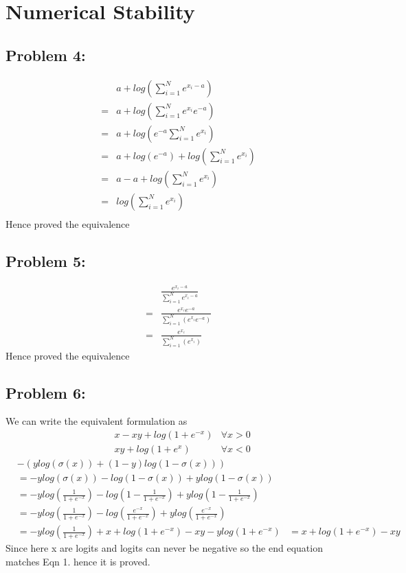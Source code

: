 \documentclass[5pt,a4paper]{article}
\begin{document}
	\section{ Numerical Stability}
	\subsection*{Problem 4:}
	\begin{eqnarray*}
	&a+log(\sum_{i=1}^{N}e^{x_i-a})\\
	=&a+log(\sum_{i=1}^{N}e^{x_i}e^{-a})\\
	=&a+log(e^{-a}\sum_{i=1}^{N}e^{x_i})\\
	=&a+log(e^{-a})+log(\sum_{i=1}^{N}e^{x_i})\\
	=&a-a+log(\sum_{i=1}^{N}e^{x_i})\\
	=&log(\sum_{i=1}^{N}e^{x_i})\\
	\end{eqnarray*}
	Hence proved the equivalence
	
	\subsection*{Problem 5:}
	\begin{eqnarray*}
		&\frac{e^{x_i-a}}{\sum_{i=1}^{N}e^{x_i-a}}\\
		=&\frac{e^{x_i}e^{-a}}{\sum_{i=1}^{N}(e^{x_i}e^{-a})}\\
		=&\frac{e^{x_i}}{\sum_{i=1}^{N}(e^{x_i})}
	\end{eqnarray*}
	Hence proved the equivalence
	
	\subsection*{Problem 6:}
	We can write the equivalent formulation as
	\begin{eqnarray}
		&x-xy+log(1+e^{-x})&\forall x>0\\
		&xy+log(1+e^{x})&\forall x<0
	\end{eqnarray}
	\begin{eqnarray*}
	&-(y log(\sigma(x))+(1-y)log(1-\sigma(x)))\\
	&=-y log(\sigma(x))-log(1-\sigma(x))+y log(1-\sigma(x))\\
	&=-y log(\frac{1}{1+e^{-x}})-log(1-\frac{1}{1+e^{-x}})+y log(1-\frac{1}{1+e^{-x}})\\
	&=-y log(\frac{1}{1+e^{-x}})-log(\frac{e^{-x}}{1+e^{-x}})+ylog(\frac{e^{-x}}{1+e^{-x}})\\
	&=-y log(\frac{1}{1+e^{-x}})+x+log(1+e^{-x})-xy-ylog(1+e^{-x})
	&=x+log(1+e^{-x})-xy
	\end{eqnarray*}
	Since here x are logits and logits can never be negative so the end equation matches Eqn 1. hence it is proved.
\end{document}
